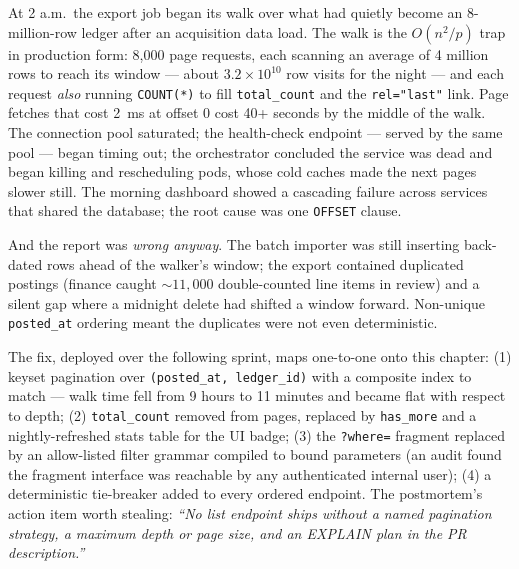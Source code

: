 At 2 a.m.\ the export job began its walk over what had quietly become an
8-million-row ledger after an acquisition data load. The walk is the
$O(n^2/p)$ trap in production form: 8{,}000 page requests, each scanning an
average of 4 million rows to reach its window --- about $3.2 \times 10^{10}$
row visits for the night --- and each request \emph{also} running
\texttt{COUNT(*)} to fill \texttt{total\_count} and the \texttt{rel="last"}
link. Page fetches that cost 2~ms at offset 0 cost 40+ seconds by the
middle of the walk. The connection pool saturated; the health-check endpoint
--- served by the same pool --- began timing out; the orchestrator concluded
the service was dead and began killing and rescheduling pods, whose cold
caches made the next pages slower still. The morning dashboard showed a
cascading failure across services that shared the database; the root cause
was one \texttt{OFFSET} clause.

And the report was \emph{wrong anyway}. The batch importer was still
inserting back-dated rows ahead of the walker's window; the export contained
duplicated postings (finance caught ${\sim}11{,}000$ double-counted line
items in review) and a silent gap where a midnight delete had shifted a
window forward. Non-unique \texttt{posted\_at} ordering meant the duplicates
were not even deterministic.

The fix, deployed over the following sprint, maps one-to-one onto this
chapter: (1) keyset pagination over \texttt{(posted\_at, ledger\_id)} with a
composite index to match --- walk time fell from 9 hours to 11 minutes and
became flat with respect to depth; (2) \texttt{total\_count} removed from
pages, replaced by \texttt{has\_more} and a nightly-refreshed stats table
for the UI badge; (3) the \texttt{?where=} fragment replaced by an
allow-listed filter grammar compiled to bound parameters (an audit found
the fragment interface was reachable by any authenticated internal user);
(4) a deterministic tie-breaker added to every ordered endpoint. The
postmortem's action item worth stealing: \emph{``No list endpoint ships
without a named pagination strategy, a maximum depth or page size, and an
EXPLAIN plan in the PR description.''}

